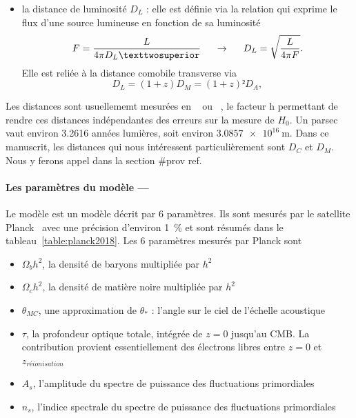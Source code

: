 \documentclass[11pt, twoside, a4paper, openright]{report}
\begin{document}
\begin{itemize}[label=$\bullet$]
\item la distance de luminosité $D_L$ : elle est définie via la relation qui exprime le flux d'une source lumineuse en fonction de sa luminosité
  \begin{equation}
    \label{eq:dist_lum}
    F = \frac{L}{4\pi D_L²} \hspace{0.5cm} \rightarrow \hspace{0.5cm} D_L = \sqrt{\frac{L}{4 \pi F}} .
  \end{equation}
  Elle est reliée à la distance comobile transverse via
  \begin{equation}
    D_L = (1+z) D_M = (1+z)² D_A ,
  \end{equation}
\end{itemize}

Les distances sont usuellememt mesurées en \si{\perh\kpc} ou \si{\perh\Mpc}, le facteur $\mathrm{h}$ permettant de rendre ces distances indépendantes des erreurs sur la mesure de $H_{0}$. Un parsec vaut environ \num{3.2616} années lumières, soit environ $\SI{3,0857 e16}{\meter}$.
Dans ce manuscrit, les distances qui nous intéressent particulièrement sont $D_C$ et $D_M$. Nous y ferons appel dans la section \#prov ref.

\paragraph{Les paramètres du modèle —} 
Le modèle \lcdm{} est un modèle décrit par 6 paramètres. Ils sont mesurés par le satellite Planck~\cite{CITE ref} avec une précision d'environ 1~\% et sont résumés dans le tableau~\ref{table:planck2018}. Les 6 paramètres mesurés par Planck sont
\begin{itemize}
\item $\Omega_bh^2$, la densité de baryons multipliée par $h^2$
\item $\Omega_ch^2$, la densité de matière noire multipliée par $h^2$
\item $\theta_{MC}$, une approximation de $\theta_*$ : l'angle sur le ciel de l'échelle acoustique
\item $\tau$, la profondeur optique totale, intégrée de $z=0$ jusqu'au CMB. La contribution provient essentiellement des électrons libres entre $z = 0$ et $z_{réionisation}$
\item $A_s$, l'amplitude du spectre de puissance des fluctuations primordiales 
\item $n_s$, l'indice spectrale du spectre de puissance des fluctuations primordiales
\end{itemize}
\end{document}
